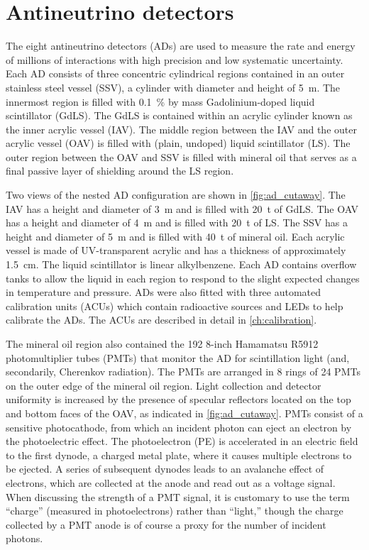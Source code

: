 \section{Antineutrino detectors}

The eight antineutrino detectors (ADs) are used to measure
the rate and energy of millions of \nuebar interactions with high precision
and low systematic uncertainty.
Each AD consists of three concentric cylindrical regions
contained in an outer stainless steel vessel (SSV),
a cylinder with diameter and height of \SI{5}{\m}.
The innermost region is filled with \SI{0.1}{\percent} by mass
Gadolinium-doped liquid scintillator (GdLS).
The GdLS is contained within an acrylic cylinder known as the inner acrylic vessel (IAV).
The middle region between the IAV and the outer acrylic vessel (OAV) is filled
with (plain, undoped) liquid scintillator (LS).
The outer region between the OAV and SSV is filled with mineral oil
that serves as a final passive layer of shielding around the LS region.

Two views of the nested AD configuration are shown in \cref{fig:ad_cutaway}.
The IAV has a height and diameter of \SI{3}{\m} and is filled with \SI{20}{\tonne}
of GdLS.
The OAV has a height and diameter of \SI{4}{\m} and is filled with \SI{20}{\tonne}
of LS.
The SSV has a height and diameter of \SI{5}{\m} and is filled with \SI{40}{\tonne}
of mineral oil.
Each acrylic vessel is made of UV-transparent acrylic
and has a thickness of approximately \SI{1.5}{\cm}.
The liquid scintillator is linear alkylbenzene.
Each AD contains overflow tanks to allow the liquid in each region
to respond to the slight expected changes in temperature and pressure.
ADs were also fitted with three automated calibration units (ACUs)
which contain radioactive sources and LEDs to help calibrate the ADs.
The ACUs are described in detail in \cref{ch:calibration}.

The mineral oil region also contained the 192 8-inch Hamamatsu R5912
photomultiplier tubes (PMTs) that monitor the AD for scintillation light
(and, secondarily, Cherenkov radiation).
The PMTs are arranged in 8 rings of 24 PMTs on the outer edge of the mineral oil region.
Light collection and detector uniformity is increased by the presence of
specular reflectors located on the top and bottom faces of the OAV,
as indicated in \cref{fig:ad_cutaway}.
PMTs consist of a sensitive photocathode, from which an incident photon
can eject an electron by the photoelectric effect.
The photoelectron (PE) is accelerated in an electric field to the first dynode,
a charged metal plate, where it causes multiple electrons to be ejected.
A series of subsequent dynodes leads to an avalanche effect of electrons,
which are collected at the anode and read out as a voltage signal.
When discussing the strength of a PMT signal,
it is customary to use the term ``charge'' (measured in photoelectrons)
rather than ``light,''
though the charge collected by a PMT anode
is of course a proxy for the number of incident photons.

